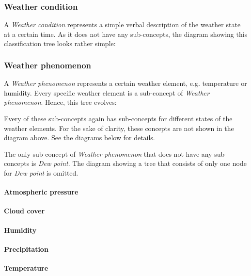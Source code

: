 \subsubsection{Weather condition}

A \emph{Weather condition} represents a simple verbal description of the weather state at a certain time. As it does not have any sub-concepts, the diagram showing this classification tree looks rather simple:


\subsubsection{Weather phenomenon}

A \emph{Weather phenomenon} represents a certain weather element, e.g. temperature or humidity. Every specific weather element is a sub-concept of \emph{Weather phenomenon}. Hence, this tree evolves:

Every of these sub-concepts again has sub-concepts for different states of the weather elements. For the sake of clarity, these concepts are not shown in the diagram above. See the diagrams below for details.

The only sub-concept of \emph{Weather phenomenon} that does not have any sub-concepts is \emph{Dew point}. The diagram showing a tree that consists of only one node for \emph{Dew point} is omitted.

\paragraph{Atmospheric pressure}

\paragraph{Cloud cover}

\paragraph{Humidity}

\paragraph{Precipitation}

\paragraph{Temperature}

